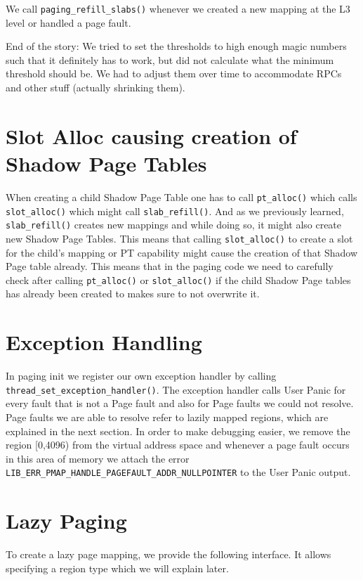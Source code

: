 We call \texttt{paging_refill_slabs()} whenever we created a new mapping at the L3 level or handled a page fault.


End of the story: We tried to set the thresholds to high enough magic numbers such that it definitely has to work, but did not calculate what the minimum threshold should be. We had to adjust them over time to accommodate RPCs and other stuff (actually shrinking them).


\section{Slot Alloc causing creation of Shadow Page Tables}

When creating a child Shadow Page Table one has to call \texttt{pt_alloc()} which calls \texttt{slot_alloc()} which might call \texttt{slab_refill()}. And as we previously learned, \texttt{slab_refill()} creates new mappings and while doing so, it might also create new Shadow Page Tables. This means that calling  \texttt{slot_alloc()} to create a slot for the child's mapping or PT capability might cause the creation of that Shadow Page table already. This means that in the paging code we need to carefully check after calling \texttt{pt_alloc()} or \texttt{slot_alloc()} if the child Shadow Page tables has already been created to makes sure to not overwrite it.

\section{Exception Handling}

In paging init we register our own exception handler by calling \texttt{thread_set_exception_handler()}. The exception handler calls User Panic for every fault that is not a Page fault and also for Page faults we could not resolve. Page faults we are able to resolve refer to lazily mapped regions, which are explained in the next section. In order to make debugging easier, we remove the region [0,4096) from the virtual address space and whenever a page fault occurs in this area of memory we attach the error \texttt{LIB_ERR_PMAP_HANDLE_PAGEFAULT_ADDR_NULLPOINTER} to the User Panic output.


\section{Lazy Paging}
To create a lazy page mapping, we provide the following interface. It allows specifying a region type which we will explain later.


